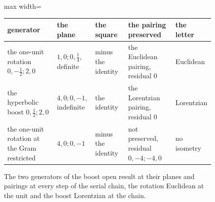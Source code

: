 \begin{figure}[h]\centering
\begin{adjustbox}{max width=\linewidth}\begin{tabular}{lllll}\toprule
generator & the plane & the square & the pairing preserved & the letter \\ \midrule
the one-unit rotation $0,-\tfrac{1}{2};2,0$ & $1,0;0,\tfrac{1}{4}$, definite & minus the identity & the Euclidean pairing, residual $0$ & Euclidean \\
the hyperbolic boost $0,\tfrac{1}{2};2,0$ & $4,0;0,-1$, indefinite & the identity & the Lorentzian pairing, residual $0$ & Lorentzian \\
the one-unit rotation at the Gram restricted & $4,0;0,-1$ & minus the identity & not preserved, residual $0,-4;-4,0$ & no isometry \\ \bottomrule
\end{tabular}\end{adjustbox}
\caption{The two generators of the boost open result at their planes and pairings at every step of the serial chain, the rotation Euclidean at the unit and the boost Lorentzian at the chain.}
\end{figure}
\par\medskip{}\label{narr:close:3-3}\par
